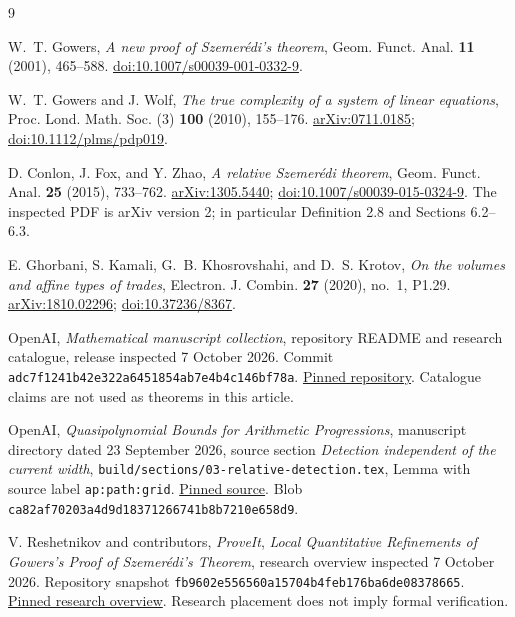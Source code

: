 \documentclass[11pt,a4paper]{article}
\numberwithin{equation}{section}
\theoremstyle{definition}
\theoremstyle{remark}
\newcommand{\1}{\mathbf 1}
\begin{document}
\begin{thebibliography}{9}
\raggedright
{}
W.~T. Gowers, \emph{A new proof of Szemer\'edi's theorem},
Geom. Funct. Anal. \textbf{11} (2001), 465--588.
\href{https://doi.org/10.1007/s00039-001-0332-9}{doi:10.1007/s00039-001-0332-9}.

W.~T. Gowers and J. Wolf, \emph{The true complexity of a system of linear
equations}, Proc. Lond. Math. Soc. (3) \textbf{100} (2010), 155--176.
\href{https://arxiv.org/abs/0711.0185}{arXiv:0711.0185};
\href{https://doi.org/10.1112/plms/pdp019}{doi:10.1112/plms/pdp019}.

D. Conlon, J. Fox, and Y. Zhao, \emph{A relative Szemer\'edi theorem},
Geom. Funct. Anal. \textbf{25} (2015), 733--762.
\href{https://arxiv.org/abs/1305.5440}{arXiv:1305.5440};
\href{https://doi.org/10.1007/s00039-015-0324-9}{doi:10.1007/s00039-015-0324-9}.
The inspected PDF is arXiv version 2; in particular Definition 2.8 and
Sections 6.2--6.3.

E. Ghorbani, S. Kamali, G.~B. Khosrovshahi, and D.~S. Krotov,
\emph{On the volumes and affine types of trades},
Electron. J. Combin. \textbf{27} (2020), no.~1, P1.29.
\href{https://arxiv.org/abs/1810.02296}{arXiv:1810.02296};
\href{https://doi.org/10.37236/8367}{doi:10.37236/8367}.

OpenAI, \emph{Mathematical manuscript collection}, repository README and
research catalogue, release inspected 7 October 2026.
Commit \texttt{adc7f1241b42e322a6451854ab7e4b4c146bf78a}.
\href{https://github.com/openai/math/tree/adc7f1241b42e322a6451854ab7e4b4c146bf78a}{Pinned repository}.
Catalogue claims are not used as theorems in this article.

OpenAI, \emph{Quasipolynomial Bounds for Arithmetic Progressions},
manuscript directory dated 23 September 2026, source section
\emph{Detection independent of the current width},
\texttt{build/sections/03-relative-detection.tex},
Lemma with source label \texttt{ap:path:grid}.
\href{https://github.com/openai/math/blob/adc7f1241b42e322a6451854ab7e4b4c146bf78a/preprints/Quasipolynomial-Bounds-for-Arithmetic-Progressions-September-23-2026/build/sections/03-relative-detection.tex}{Pinned source}.
Blob \texttt{ca82af70203a4d9d18371266741b8b7210e658d9}.

V. Reshetnikov and contributors, \emph{ProveIt},
\emph{Local Quantitative Refinements of Gowers's Proof of Szemer\'edi's
Theorem}, research overview inspected 7 October 2026.
Repository snapshot \texttt{fb9602e556560a15704b4feb176ba6de08378665}.
\href{https://github.com/VladimirReshetnikov/ProveIt/blob/fb9602e556560a15704b4feb176ba6de08378665/Combinatorics/Ramsey/Research/GowersSzemeredi/local-quantitative-refinements/README.md}{Pinned research overview}.
Research placement does not imply formal verification.
\end{thebibliography}
\end{document}
